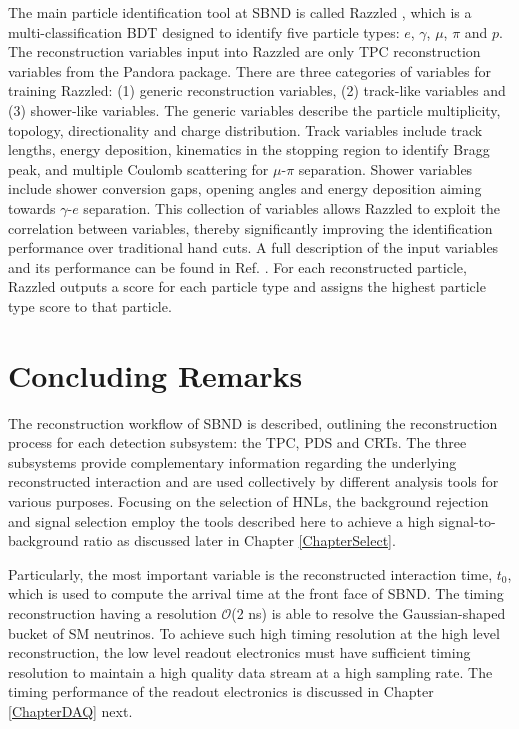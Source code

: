 The main particle identification tool at SBND is called Razzled \cite{razzled}, which is a multi-classification BDT designed to identify five particle types: $e$, $\gamma$, $\mu$, $\pi$ and $p$.
The reconstruction variables input into Razzled are only TPC reconstruction variables from the Pandora package.
There are three categories of variables for training Razzled: (1) generic reconstruction variables, (2) track-like variables and (3) shower-like variables.
The generic variables describe the particle multiplicity, topology, directionality and charge distribution.
Track variables include track lengths, energy deposition, kinematics in the stopping region to identify Bragg peak, and multiple Coulomb scattering for $\mu$-$\pi$ separation.
Shower variables include shower conversion gaps, opening angles and energy deposition aiming towards $\gamma$-$e$ separation.
This collection of variables allows Razzled to exploit the correlation between variables, thereby significantly improving the identification performance over traditional hand cuts.
A full description of the input variables and its performance can be found in Ref. \cite{EdPhD}.
For each reconstructed particle, Razzled outputs a score for each particle type and assigns the highest particle type score to that particle.

\section{Concluding Remarks}
\label{sec:reco_concluding_remarks}

The reconstruction workflow of SBND is described, outlining the reconstruction process for each detection subsystem: the TPC, PDS and CRTs.
The three subsystems provide complementary information regarding the underlying reconstructed interaction and are used collectively by different analysis tools for various purposes.
Focusing on the selection of HNLs, the background rejection and signal selection employ the tools described here to achieve a high signal-to-background ratio as discussed later in Chapter \ref{ChapterSelect}.

Particularly, the most important variable is the reconstructed interaction time, $t_0$, which is used to compute the arrival time at the front face of SBND.
The timing reconstruction having a resolution $\mathcal{O}$(2 ns) is able to resolve the Gaussian-shaped bucket of SM neutrinos.
To achieve such high timing resolution at the high level reconstruction, the low level readout electronics must have sufficient timing resolution to maintain a high quality data stream at a high sampling rate.
The timing performance of the readout electronics is discussed in Chapter \ref{ChapterDAQ} next.

